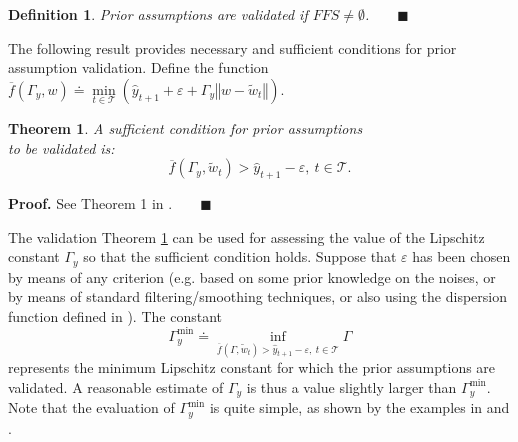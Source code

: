 \documentclass[twocolumn,english,journal]{IEEEtran}
\newtheorem{theorem}{Theorem}
\newtheorem{definition}{Definition}
\begin{document}
\begin{definition} \label{Def:validation}Prior assumptions are validated
if $FFS\neq\emptyset$.$\qquad\blacksquare$ \end{definition}\medskip{}


The following result provides necessary and sufficient conditions
for prior assumption validation. Define the function $\overline{f}\left(\Gamma_{y},w\right)\doteq\min\limits _{t\in\mathcal{T}}\left(\hat{y}_{t+1}+\varepsilon+\Gamma_{y}\left\Vert w-\widetilde{w}_{t}\right\Vert \right).$\medskip{}


\begin{theorem} \label{fals}A sufficient condition for prior assumptions
\\
to be validated is: 
\[
\overline{f}\left(\Gamma_{y},\widetilde{w}_{t}\right)>\hat{y}_{t+1}-\varepsilon,\ t\in\mathcal{T}.
\]
 \end{theorem}\medskip{}


\textbf{Proof.} See Theorem 1 in \cite{MiNoAUT04}.$\qquad\blacksquare$\medskip{}


The validation Theorem \ref{fals} can be used for assessing the value
of the Lipschitz constant $\Gamma_{y}$ so that the sufficient condition
holds. Suppose that $\varepsilon$ has been chosen by means of any
criterion (e.g. based on some prior knowledge on the noises, or by
means of standard filtering/smoothing techniques, or also using the
dispersion function defined in \cite{MiNoCDC05}). The constant
\begin{equation}
\Gamma_{y}^{\min}\doteq\inf_{\overline{f}\left(\Gamma,\widetilde{w}_{t}\right)>\hat{y}_{t+1}-\varepsilon,\ t\in\mathcal{T}}\Gamma\label{eq:gamin}
\end{equation}
represents the minimum Lipschitz constant for which the prior assumptions
are validated. A reasonable estimate of $\Gamma_{y}$ is thus a value
slightly larger than $\Gamma_{y}^{\min}$. Note that the evaluation
of $\Gamma_{y}^{\min}$ is quite simple, as shown by the examples
in \cite{MiNoAUT04} and \cite{MiNoTAC05}.



\end{document}
